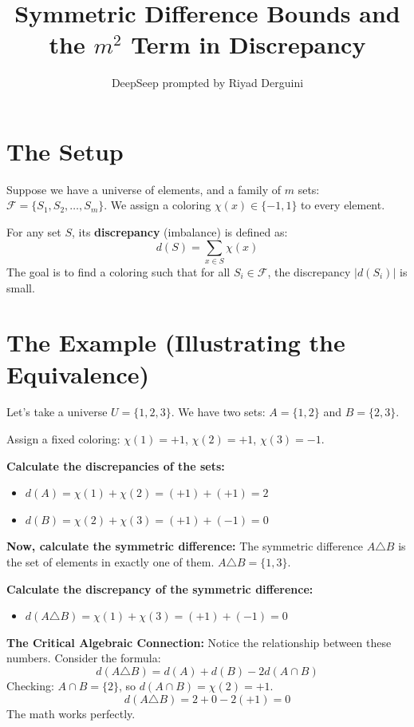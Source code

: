 \documentclass[11pt]{article}
\title{Symmetric Difference Bounds and the \(m^2\) Term in Discrepancy}
\author{DeepSeep prompted by Riyad Derguini}
\date{}
\begin{document}
\maketitle

\section{The Setup}
Suppose we have a universe of elements, and a family of \(m\) sets: \(\mathcal{F} = \{S_1, S_2, \dots, S_m\}\). 
We assign a coloring \(\chi(x) \in \{-1, 1\}\) to every element. 

For any set \(S\), its \textbf{discrepancy} (imbalance) is defined as:
\[
 d(S) = \sum_{x \in S} \chi(x) 
\]
The goal is to find a coloring such that for all \(S_i \in \mathcal{F}\), the discrepancy \(|d(S_i)|\) is small.

\hrulefill

\section{The Example (Illustrating the Equivalence)}

Let's take a universe \(U = \{1, 2, 3\}\). 
We have two sets: \(A = \{1, 2\}\) and \(B = \{2, 3\}\).

Assign a fixed coloring: \(\chi(1) = +1\), \(\chi(2) = +1\), \(\chi(3) = -1\).

\textbf{Calculate the discrepancies of the sets:}
\begin{itemize}
    \item \(d(A) = \chi(1) + \chi(2) = (+1) + (+1) = 2\)
    \item \(d(B) = \chi(2) + \chi(3) = (+1) + (-1) = 0\)
\end{itemize}

\textbf{Now, calculate the symmetric difference:}
The symmetric difference \(A \triangle B\) is the set of elements in exactly one of them. 
\(A \triangle B = \{1, 3\}\).

\textbf{Calculate the discrepancy of the symmetric difference:}
\begin{itemize}
    \item \(d(A \triangle B) = \chi(1) + \chi(3) = (+1) + (-1) = 0\)
\end{itemize}

\textbf{The Critical Algebraic Connection:}
Notice the relationship between these numbers. Consider the formula:
\[
 d(A \triangle B) = d(A) + d(B) - 2d(A \cap B) 
\]
Checking: \(A \cap B = \{2\}\), so \(d(A \cap B) = \chi(2) = +1\).
\[
 d(A \triangle B) = 2 + 0 - 2(+1) = 0 
\]
The math works perfectly.
\end{document}
